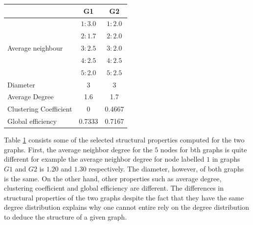 \documentclass[10pt,a4paper]{article}
\begin{document}
\begin{table}[H]
	\centering
	\renewcommand{\arraystretch}{1.2}
	\begin{tabular}{|l|c|c|}
		\hline
		&G1 & G2 \\
		\hline
		\multirow{5}{*}{Average neighbour} & $1:3.0$ & $1: 2.0$\\
		& $2: 1.7$ & $2:2.0$\\
		& $3: 2.5$ & $3:2.0 $ \\
		& $4: 2.5$ & $4:2.5 $ \\ 
		& $5: 2.0$ & $5:2.5 $ \\
		\hline
		Diameter & 3 & 3 \\
		\hline
		Average Degree & 1.6 & 1.7 \\
		\hline
		Clustering Coefficient & 0 &0.4667 \\
		\hline
		Global efficiency & 0.7333 & 0.7167 \\
		\hline
	\end{tabular} 
    \label{table-properties}
\end{table}

Table \ref{table-properties} consists some of the selected structural properties computed for the two graphs. First, the average neighbor degree for the $5$ nodes for bth graphs is quite different for example  the average neighbor degree for node labelled $1$ in graphs $G1$ and $G2$ is  $1.20$ and $1.30$ respectively. The diameter, however, of both graphs is the same. On the other hand, other properties such as average degree, clustering coefficient and global efficiency are different. The differences in structural properties of the two graphs despite the fact that they have the same degree distribution explains why one cannot entire rely on the degree distribution to deduce the structure of a given graph. 
\end{document}
